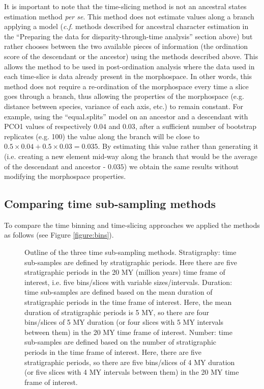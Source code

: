 \documentclass[12pt,a4paper]{article}
\begin{document}
It is important to note that the time-slicing method is not an ancestral states estimation method \textit{per se}.
This method does not estimate values along a branch applying a model (\textit{c.f.} methods described for ancestral character estimation in the ``Preparing the data for disparity-through-time analysis'' section above) but rather chooses between the two available pieces of information (the ordination score of the descendant or the ancestor) using the methods described above.
This allows the method to be used in post-ordination analysis where the data used in each time-slice is data already present in the morphospace.
In other words, this method does not require a re-ordination of the morphospace every time a slice goes through a branch, thus allowing the properties of the morphospace (e.g. distance between species, variance of each axis, etc.) to remain constant.
For example, using the ``equal.splits'' model on an ancestor and a descendant with PCO1 values of respectively $0.04$ and $0.03$, after a sufficient number of bootstrap replicates (e.g. 100) the value along the branch will be close to $0.5\times0.04 + 0.5\times0.03 = 0.035$.
By estimating this value rather than generating it (i.e. creating a new element mid-way along the branch that would be the average of the descendant and ancestor - $0.035$) we obtain the same results without modifying the morphospace properties.
 
\subsection{Comparing time sub-sampling methods}

To compare the time binning and time-slicing approaches we applied the methods as follows (see Figure \ref{figure:bins}).

\begin{figure}[!htbp]
    \centering
    \caption[Outline of the three time sub-sampling methods]
    {Outline of the three time sub-sampling methods. 
    Stratigraphy: time sub-samples are defined by stratigraphic periods.
    Here there are five stratigraphic periods in the 20 MY (million years) time frame of interest, i.e. five bins/slices with variable sizes/intervals.
    Duration: time sub-samples are defined based on the mean duration of stratigraphic periods in the time frame of interest. 
    Here, the mean duration of stratigraphic periods is 5 MY, so there are four bins/slices of 5 MY duration (or four slices with 5 MY intervals between them) in the 20 MY time frame of interest. 
    Number: time sub-samples are defined based on the number of stratigraphic periods in the time frame of interest. 
    Here, there are five stratigraphic periods, so there are five bins/slices of 4 MY duration (or five slices with 4 MY intervals between them) in the 20 MY time frame of interest.}
    \label{fig:bins}
\end{figure}
\end{document}
